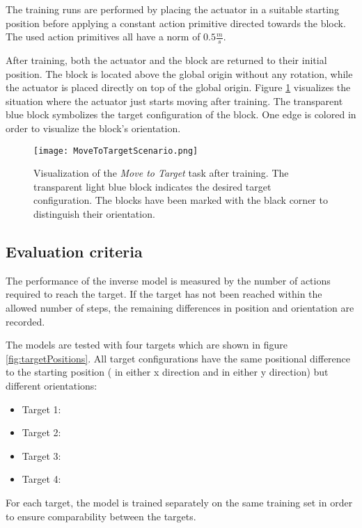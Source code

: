 The training runs are performed by placing the actuator in a suitable starting position before applying a constant action primitive directed towards the block.
The used action primitives all have a norm of $0.5\frac{m}{s}$.

After training, both the actuator and the block are returned to their initial position. The block is located  above the global origin without any rotation, while the actuator is placed directly on top of the global origin.
Figure \ref{fig:moveToTargetScenario} visualizes the situation where the actuator just starts moving after training. The transparent blue block symbolizes the target configuration of the block. One edge is colored in order to visualize the block's orientation.

\begin{figure}
\centering
\texttt{[image: MoveToTargetScenario.png]}
\caption{Visualization of the \textit{Move to Target} task after training. The transparent light blue block indicates the desired target configuration. The blocks have been marked with the black corner to distinguish their orientation.}
\label{fig:moveToTargetScenario}
\end{figure}

\subsection{Evaluation criteria}

The performance of the inverse model is measured by the number of actions required to reach the target. If the target has not been reached within the allowed number of steps, the remaining differences in position and orientation are recorded. 

The models are tested with four targets which are shown in figure  \ref{fig:targetPositions}. All target configurations have the same positional difference to the starting position ( in either x direction and  in either y direction) but different orientations: 
\begin{itemize}
\item Target 1: 
\item Target 2: 
\item Target 3:  
\item Target 4: 
\end{itemize}
For each target, the model is trained separately on the same training set in order to ensure comparability between the targets.

